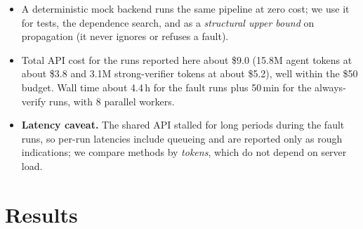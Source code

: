 \documentclass[11pt]{article}
\begin{document}
\begin{itemize}[leftmargin=*,itemsep=1pt]
        empty, no researcher, executor or verifier reply failed to parse, and
        the largest outputs used 26\% (researcher), 16\% (executor) and 44\%
        (strong verifier) of their budgets. The only problems are two planner
        replies that used the full 4096 tokens and could not be parsed, both
        in fault runs without recovery (\cref{sec:res-prop}).
  \item A deterministic mock backend runs the same pipeline at zero cost; we
        use it for tests, the dependence search, and as a \emph{structural
        upper bound} on propagation (it never ignores or refuses a fault).
  \item Total API cost for the runs reported here about \$9.0 (15.8M agent
        tokens at about \$3.8 and 3.1M strong-verifier tokens at about
        \$5.2), well within the \$50 budget. Wall time about 4.4\,h for the
        fault runs plus 50\,min for the always-verify runs, with 8 parallel
        workers.
  \item \textbf{Latency caveat.} The shared API stalled for long periods
        during the fault runs, so per-run latencies include queueing and are
        reported only as rough indications; we compare methods by
        \emph{tokens}, which do not depend on server load.
\end{itemize}

\section{Results}
\label{sec:results}
\end{document}
